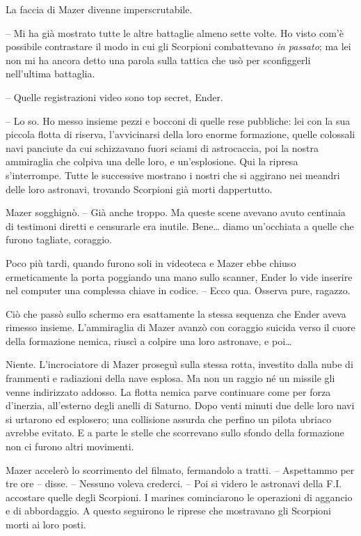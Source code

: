 {La faccia di Mazer divenne imperscrutabile.}

{-- Mi ha già mostrato tutte le altre battaglie almeno sette volte. Ho
	visto com'è possibile contrastare il modo in cui gli Scorpioni
	combattevano \emph{in passato}; ma lei non mi ha ancora detto una parola
	sulla tattica che usò per sconfiggerli nell'ultima battaglia.}

{-- Quelle registrazioni video sono top secret, Ender.}

{-- Lo so. Ho messo insieme pezzi e bocconi di quelle rese pubbliche:
	lei con la sua piccola flotta di riserva, l'avvicinarsi della loro
	enorme formazione, quelle colossali navi panciute da cui schizzavano
	fuori sciami di astrocaccia, poi la nostra ammiraglia che colpiva una
	delle loro, e un'esplosione. Qui la ripresa s'interrompe. Tutte le
	successive mostrano i nostri che si aggirano nei meandri delle loro
	astronavi, trovando Scorpioni già morti dappertutto.}

{Mazer sogghignò. -- Già anche troppo. Ma queste scene avevano avuto
	centinaia di testimoni diretti e censurarle era inutile. Bene\ldots{}
	diamo un'occhiata a quelle che furono tagliate, coraggio.}

{Poco più tardi, quando furono soli in videoteca e Mazer ebbe chiuso
	ermeticamente la porta poggiando una mano sullo scanner, Ender lo vide
	inserire nel computer una complessa chiave in codice. -- Ecco qua.
	Osserva pure, ragazzo.}

{Ciò che passò sullo schermo era esattamente la stessa sequenza che
	Ender aveva rimesso insieme. L'ammiraglia di Mazer avanzò con coraggio
	suicida verso il cuore della formazione nemica, riuscì a colpire una
	loro astronave, e poi\ldots{}}

{Niente. L'incrociatore di Mazer proseguì sulla stessa rotta, investito
	dalla nube di frammenti e radiazioni della nave esplosa. Ma non un
	raggio né un missile gli venne indirizzato addosso. La flotta nemica
	parve continuare come per forza d'inerzia, all'esterno degli anelli di
	Saturno. Dopo venti minuti due delle loro navi si urtarono ed esplosero;
	una collisione assurda che perfino un pilota ubriaco avrebbe evitato. E
	a parte le stelle che scorrevano sullo sfondo della formazione non ci
	furono altri movimenti.}

{Mazer accelerò lo scorrimento del filmato, fermandolo a tratti. --
	Aspettammo per tre ore -- disse. -- Nessuno voleva crederci. -- Poi si
	videro le astronavi della F.I. accostare quelle degli Scorpioni. I
	marines cominciarono le operazioni di aggancio e di abbordaggio. A
	questo seguirono le riprese che mostravano gli Scorpioni morti ai loro
	posti.}

